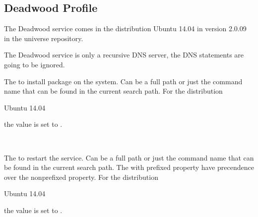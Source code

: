 \label{sec:deadwood_profile}
\subsection{Deadwood Profile}

The Deadwood service comes in the distribution Ubuntu 14.04 in version 2.0.09 
in the universe repository.

The Deadwood service is only a recursive DNS server, the 
DNS  statements are going to be ignored.


The  to install package on the system. Can be a full path or
just the command name that can be found in the current search path. 
For the distribution
\begin{inparaitem}
\item[\TheDistribution{ubuntu}] Ubuntu 14.04
\end{inparaitem}
the value is set to .

\\

The  to restart the service. Can be a full path or
just the command name that can be found in the current search path. 
The with  prefixed property have precendence over the 
nonprefixed property.
For the distribution
\begin{inparaitem}
\item[\TheDistribution{ubuntu}] Ubuntu 14.04
\end{inparaitem}
the value is set to .

\\

